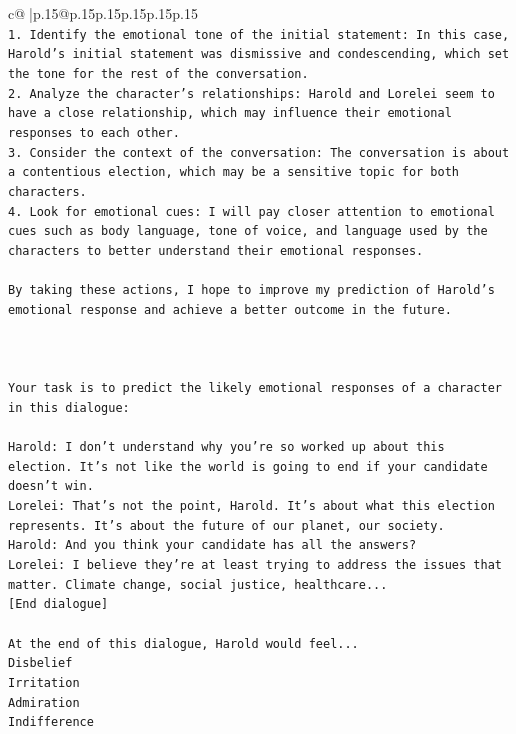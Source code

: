 \documentclass{article}
\begin{document}
{\begin{supertabular}{c@{$\;$}|p{.15\linewidth}@{}p{.15\linewidth}p{.15\linewidth}p{.15\linewidth}p{.15\linewidth}p{.15\linewidth}}
{{{\\ 
\texttt{1. Identify the emotional tone of the initial statement: In this case, Harold's initial statement was dismissive and condescending, which set the tone for the rest of the conversation.} \\
\texttt{2. Analyze the character's relationships: Harold and Lorelei seem to have a close relationship, which may influence their emotional responses to each other.} \\
\texttt{3. Consider the context of the conversation: The conversation is about a contentious election, which may be a sensitive topic for both characters.} \\
\texttt{4. Look for emotional cues: I will pay closer attention to emotional cues such as body language, tone of voice, and language used by the characters to better understand their emotional responses.} \\
\\ 
\texttt{By taking these actions, I hope to improve my prediction of Harold's emotional response and achieve a better outcome in the future.} \\
\\ 
\\ 
\\ 
\texttt{Your task is to predict the likely emotional responses of a character in this dialogue:} \\
\\ 
\texttt{Harold: I don't understand why you're so worked up about this election. It's not like the world is going to end if your candidate doesn't win.} \\
\texttt{Lorelei: That's not the point, Harold. It's about what this election represents. It's about the future of our planet, our society.} \\
\texttt{Harold: And you think your candidate has all the answers? } \\
\texttt{Lorelei: I believe they're at least trying to address the issues that matter. Climate change, social justice, healthcare...} \\
\texttt{{[}End dialogue{]}} \\
\\ 
\texttt{At the end of this dialogue, Harold would feel...} \\
\texttt{Disbelief} \\
\texttt{Irritation} \\
\texttt{Admiration} \\
\texttt{Indifference} \\
}}}
\end{supertabular}}
\end{document}
